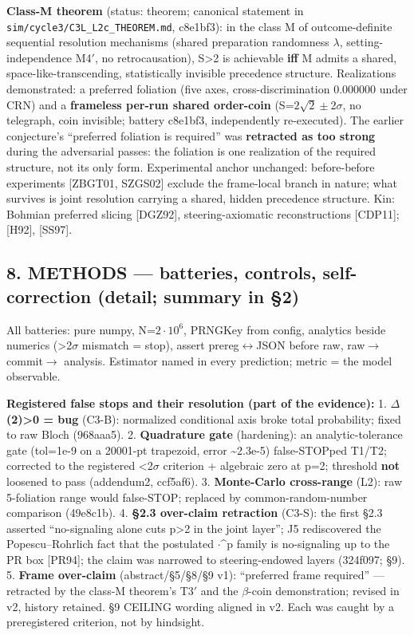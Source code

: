 \documentclass[
  11pt]{article}
\begin{document}
\textbf{Class-M theorem} (status: theorem; canonical statement in
\texttt{sim/cycle3/C3L\_L2c\_THEOREM.md}, c8e1bf3): in the class M of
outcome-definite sequential resolution mechanisms (shared preparation
randomness $\lambda$, setting-independence M4$'$, no retrocausation),
S\textgreater2 is achievable \textbf{iff} M admits a shared,
space-like-transcending, statistically invisible precedence structure.
Realizations demonstrated: a preferred foliation (five axes,
cross-discrimination 0.000000 under CRN) and a \textbf{frameless per-run
shared order-coin} (S=$2\sqrt{2}\pm$2$\sigma$, no telegraph, coin invisible; battery
c8e1bf3, independently re-executed). The earlier conjecture's
``preferred foliation is required'' was \textbf{retracted as too strong}
during the adversarial passes: the foliation is one realization of the
required structure, not its only form. Experimental anchor unchanged:
before-before experiments {[}ZBGT01, SZGS02{]} exclude the frame-local
branch in nature; what survives is joint resolution carrying a shared,
hidden precedence structure. Kin: Bohmian preferred slicing {[}DGZ92{]},
steering-axiomatic reconstructions {[}CDP11{]}; {[}H92{]}, {[}SS97{]}.

\subsection{8. METHODS --- batteries, controls, self-correction (detail;
summary in
\S2)}\label{methods-batteries-controls-self-correction-detail-summary-in-2}

All batteries: pure numpy, N=$2\cdot 10^{6}$, PRNGKey from config, analytics
beside numerics (\textgreater2$\sigma$ mismatch = stop), assert prereg$\leftrightarrow$JSON
before raw, raw$\to$commit$\to$ analysis. Estimator named in every prediction;
metric = the model observable.

\textbf{Registered false stops and their resolution (part of the
evidence):} 1. \textbf{$\Delta$(2)\textgreater0 = bug} (C3-B): normalized
conditional axis broke total probability; fixed to raw Bloch (968aaa5).
2. \textbf{Quadrature gate} (hardening): an analytic-tolerance gate
(tol=1e-9 on a 20001-pt trapezoid, error \textasciitilde2.3e-5)
false-STOPped T1/T2; corrected to the registered \textless2$\sigma$ criterion +
algebraic zero at p=2; threshold \textbf{not} loosened to pass
(addendum2, ccf5af6). 3. \textbf{Monte-Carlo cross-range} (L2): raw
5-foliation range would false-STOP; replaced by common-random-number
comparison (49e8c1b). 4. \textbf{\S2.3 over-claim retraction} (C3-S): the
first \S2.3 asserted ``no-signaling alone cuts p\textgreater2 in the
joint layer''; J5 rediscovered the Popescu--Rohrlich fact that the
postulated \textbar$\cdot$\textbar\^{}p family is no-signaling up to the PR
box {[}PR94{]}; the claim was narrowed to steering-endowed layers
(324f097; \S9). 5. \textbf{Frame over-claim} (abstract/\S5/\S8/\S9 v1):
``preferred frame required'' --- retracted by the class-M theorem's T3$'$
and the $\beta$-coin demonstration; revised in v2, history retained. \S9
CEILING wording aligned in v2. Each was caught by a preregistered
criterion, not by hindsight.
\end{document}
